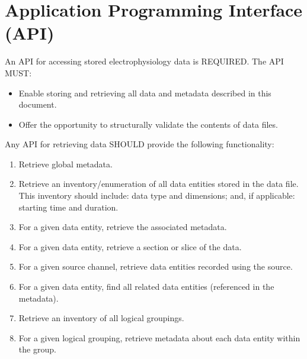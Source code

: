 \documentclass[letterpaper, 10 pt, conference]{ieeeconf}  \IEEEoverridecommandlockouts                              \overrideIEEEmargins
\begin{document}
\section{\textbf{Application Programming Interface (API)}}
An API for accessing stored electrophysiology data is REQUIRED. The API MUST:
\begin{itemize}
\item Enable storing and retrieving all data and metadata described in this document.
\item Offer the opportunity to structurally validate the contents of data files.
\end{itemize}
Any API for retrieving data SHOULD provide the following functionality:
\begin{enumerate}
\item Retrieve global metadata.
\item Retrieve an inventory/enumeration of all data entities stored in the data file.  This inventory should include: data type and dimensions; and, if applicable: starting time and duration.
\item For a given data entity, retrieve the associated metadata.
\item For a given data entity, retrieve a section or slice of the data.
\item For a given source channel, retrieve data entities recorded using the source.
\item For a given data entity, find all related data entities (referenced in the metadata).
\item Retrieve an inventory of all logical groupings.
\item For a given logical grouping, retrieve metadata about each data entity within the group.
\end{enumerate}

\addtolength{\textheight}{-12cm}   
\end{document}
